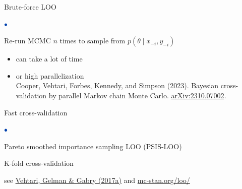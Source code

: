 \documentclass[english,t]{beamer}
\newenvironment{list1}{
   \begin{list}{$\color{list1}\bullet$}{\itemsep=6pt}}{
  \end{list}}
\begin{document}


\begin{frame}{Brute-force LOO}

\begin{list1}
\item Re-run MCMC $n$ times to sample from $p(\theta \mid x_{-i},y_{-i})$
  \begin{itemize}
  \item can take a lot of time
  \item<2-> or high parallelization\\
    Cooper, Vehtari, Forbes, Kennedy, and Simpson (2023). Bayesian
    cross-validation by parallel Markov chain Monte
    Carlo. \href{http://arxiv.org/abs/2310.07002}{arXiv:2310.07002}.
  \end{itemize}
\end{list1}

\end{frame}

\begin{frame}{Fast cross-validation}

\begin{list1}
\item Pareto smoothed importance sampling LOO (PSIS-LOO)
\item K-fold cross-validation
\end{list1}

\vspace{12\baselineskip}

{\small see \href{http://link.springer.com/article/10.1007/s11222-016-9696-4}{Vehtari, Gelman \& Gabry (2017a)} and \url{mc-stan.org/loo/}}

\end{frame}
\end{document}
